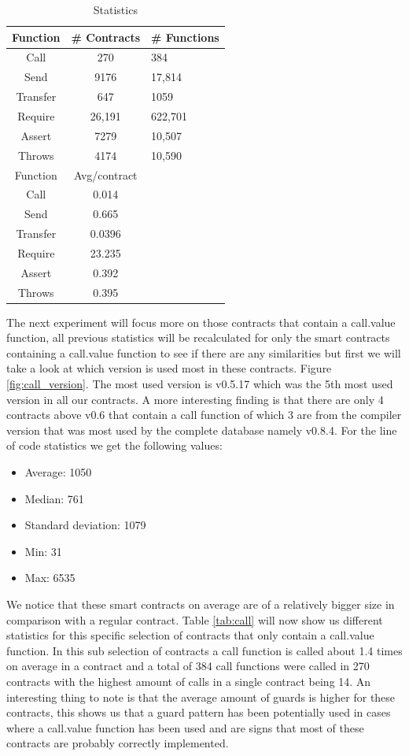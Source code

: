 \documentclass[sigconf]{acmart}
\begin{document}
\begin{table}
  \caption{Statistics}
  \label{tab:stats}
  \begin{tabular}{ccl}
    \toprule
    Function & \# Contracts & \# Functions\\
    \midrule
    Call&270&384\\
    Send&9176&17,814\\
    Transfer&647&1059\\
    Require&26,191&622,701\\
    Assert&7279&10,507\\
    Throws&4174&10,590\\
    \toprule
    Function & Avg/contract\\
    \midrule
    Call&0.014\\
    Send&0.665\\
    Transfer&0.0396\\
    Require&23.235\\
    Assert&0.392\\
    Throws&0.395\\
  \bottomrule
\end{tabular}
\end{table}
The next experiment will focus more on those contracts that contain a call.value function, all previous statistics will be recalculated for only the smart contracts containing a call.value function to see if there are any similarities but first we will take a look at which version is used most in these contracts.
Figure \ref{fig:call_version}. The most used version is v0.5.17 which was the 5th most used version in all our contracts. A more interesting finding is that there are only 4 contracts above v0.6 that contain a call function of which 3 are from the compiler version that was most used by the complete database namely v0.8.4. For the line of code statistics we get the following values:
\begin{itemize}
    \item Average: 1050
    \item Median: 761
    \item Standard deviation: 1079
    \item Min: 31
    \item Max: 6535
\end{itemize}
We notice that these smart contracts on average are of a relatively bigger size in comparison with a regular contract.
Table \ref{tab:call} will now show us different statistics for this specific selection of contracts that only contain a call.value function. In this sub selection of contracts a call function is called about 1.4 times on average in a contract and a total of 384 call functions were called in 270 contracts with the highest amount of calls in a single contract being 14. An interesting thing to note is that the average amount of guards is higher for these contracts, this shows us that a guard pattern has been potentially used in cases where a call.value function has been used and are signs that most of these contracts are probably correctly implemented. 
\end{document}
